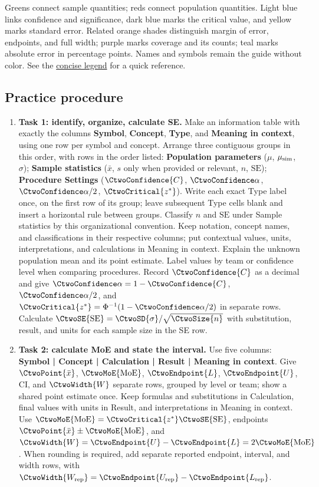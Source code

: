 \endgroup

Greens connect sample quantities; reds connect population quantities. Light blue links confidence and significance, dark blue marks the critical value, and yellow marks standard error. Related orange shades distinguish margin of error, endpoints, and full width; purple marks coverage and its counts; teal marks absolute error in percentage points. Names and symbols remain the guide without color. See the \hyperref[tab:highlight-legend]{concise legend} for a quick reference.

\subsection{Practice procedure}

\begin{enumerate}
    \item \textbf{Task 1: identify, organize, calculate SE.} Make an information table with exactly the columns \textbf{Symbol}, \textbf{Concept}, \textbf{Type}, and \textbf{Meaning in context}, using one row per symbol and concept. Arrange three contiguous groups in this order, with rows in the order listed: \textbf{Population parameters} ($\mu$, $\mu_{\rm sim}$, $\sigma$); \textbf{Sample statistics} ($\bar{x}$, $s$ only when provided or relevant, $n$, $\mathrm{SE}$); \textbf{Procedure Settings} ($\CtwoConfidence{C}$, $\CtwoSignificance{\alpha}$, $\CtwoSignificance{\alpha}/2$, $\CtwoCritical{z^*}$). Write each exact Type label once, on the first row of its group; leave subsequent Type cells blank and insert a horizontal rule between groups. Classify $n$ and $\mathrm{SE}$ under Sample statistics by this organizational convention. Keep notation, concept names, and classifications in their respective columns; put contextual values, units, interpretations, and calculations in Meaning in context. Explain the unknown population mean and its point estimate. Label values by team or confidence level when comparing procedures. Record $\CtwoConfidence{C}$ as a decimal and give $\CtwoSignificance{\alpha}=1-\CtwoConfidence{C}$, $\CtwoSignificance{\alpha}/2$, and $\CtwoCritical{z^*}=\Phi^{-1}(1-\CtwoSignificance{\alpha}/2)$ in separate rows. Calculate $\CtwoSE{\mathrm{SE}}=\CtwoSD{\sigma}/\sqrt{\CtwoSize{n}}$ with substitution, result, and units for each sample size in the SE row.
    \item \textbf{Task 2: calculate MoE and state the interval.} Use five columns: \textbf{Symbol | Concept | Calculation | Result | Meaning in context}. Give $\CtwoPoint{\bar{x}}$, $\CtwoMoE{\mathrm{MoE}}$, $\CtwoEndpoint{L}$, $\CtwoEndpoint{U}$, $\mathrm{CI}$, and $\CtwoWidth{W}$ separate rows, grouped by level or team; show a shared point estimate once. Keep formulas and substitutions in Calculation, final values with units in Result, and interpretations in Meaning in context. Use $\CtwoMoE{\mathrm{MoE}}=\CtwoCritical{z^*}\CtwoSE{\mathrm{SE}}$, endpoints $\CtwoPoint{\bar{x}}\pm\CtwoMoE{\mathrm{MoE}}$, and $\CtwoWidth{W}=\CtwoEndpoint{U}-\CtwoEndpoint{L}=2\CtwoMoE{\mathrm{MoE}}$. When rounding is required, add separate reported endpoint, interval, and width rows, with $\CtwoWidth{W_{\rm rep}}=\CtwoEndpoint{U_{\rm rep}}-\CtwoEndpoint{L_{\rm rep}}$.

\end{enumerate}
